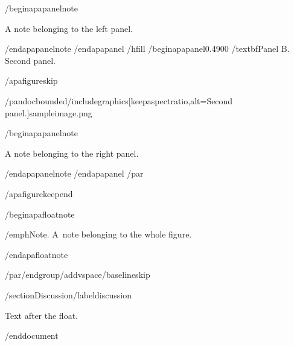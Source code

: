 /begin{apapanelnote}

A note belonging to the left panel.

/end{apapanelnote}
/end{apapanel}%
/hfill
/begin{apapanel}{0.4900}%
/textbf{Panel B}. Second panel.

/apafigureskip

/pandocbounded{/includegraphics[keepaspectratio,alt={Second panel.}]{sampleimage.png}}

/begin{apapanelnote}

A note belonging to the right panel.

/end{apapanelnote}
/end{apapanel}%
/par

/apafigurekeepend

/begin{apafloatnote}

/emph{Note}. A~note belonging to the whole figure.

/end{apafloatnote}

/par/endgroup/addvspace{/baselineskip}

/section{Discussion}/label{discussion}

Text after the float.




/end{document}
